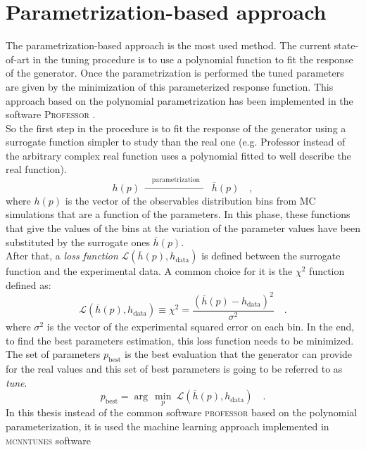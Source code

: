 \section{Parametrization-based approach}

The parametrization-based approach is the most used method. The current state-of-art in the tuning procedure is to use a polynomial function to fit the response of the generator. Once the parametrization is performed the tuned parameters are given by the minimization of this parameterized response function. This approach based on the polynomial parametrization has been  implemented in the software \textsc{Professor} \cite{Buckley:2009bj}. 
\\
So the first step in the procedure is to fit the response of the generator using a surrogate function simpler to study than the real one (e.g. Professor instead of the arbitrary complex real function uses a polynomial fitted to well describe the real function).
\begin{equation}
	h(p)\ \xrightarrow{\quad \text{parametrization}\quad }\ \overline{h}(p)\quad ,
\end{equation}
where $h(p)$ is the vector of the observables distribution bins from MC simulations that are a function of the parameters. In this phase, these functions that give the values of the bins at the variation of the parameter values have been substituted by the surrogate ones $\overline{h}(p)$.  
\\
After that, a \textit{loss function} $\mathcal{L}(\overline{h}(p),h_{\text{data}})$ is defined between the surrogate function and the experimental data. A common choice for it is the $\chi^2$ function defined as:
\begin{equation}
	\mathcal{L}(\overline{h}(p),h_{\text{data}})\equiv \chi^2=\frac{(\overline{h}(p)-h_{\text{data}})^2}{\sigma^2}\quad.
\end{equation}
where $\sigma^2$ is the vector of the experimental squared error on each bin.  
In the end, to find the best parameters estimation, this loss function needs to be minimized. The set of parameters $p_{\text{best}}$ is the best evaluation that the generator can provide for the real values and this set of best parameters is going to be referred to as \textit{tune}.
\begin{equation}
	p_{\text{best}}=\arg\,\min_p\ \mathcal{L}(\overline{h}(p),h_{\text{data}})\quad.
\end{equation}
In this thesis instead of the common software \textsc{professor} based on the polynomial parameterization, it is used the machine learning approach implemented in \textsc{mcnntunes} software \cite{MCNNTUNESonGitHub}
